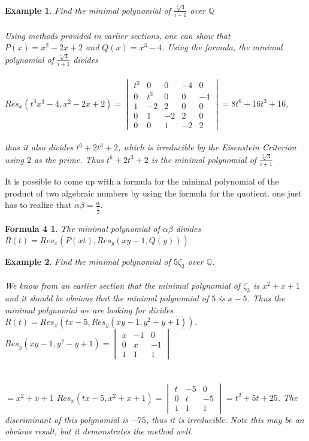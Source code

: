 \documentclass{article}
\newtheorem*{Definition: Sylvester Matrix}{Definition}
\newtheorem*{Definition: Resultant 1}{Definition 1}
\newtheorem*{Definition: Resultant 2}{Definition 2}
\newtheorem*{Theorem: Resultant proves shared roots}{Theorem 1}
\newtheorem*{Theorem: Minimal polynomial for beta}{Theorem 2}
\newtheorem*{Example: Sylvester Matrix Ex}{Example}
\newtheorem*{Theorem: Roots}{Theorem}
\newtheorem*{Corollary: Discriminant}{Corollary}
\newtheorem*{Theorem: Rational Root Theorem}{Theorem}
\newtheorem*{Corollary: Cubic Irreducibility}{Corollary}
\newtheorem*{Theorem: Eisenstein Criterion}{Theorem}
\newtheorem*{Theorem: mod p Test}{Theorem}
\newtheorem*{Theorem: Rabin's algorithm}{Theorem}
\newtheorem*{Theorem: gcd finite field}{Theorem}
\newtheorem*{Theorem: Gauss Irreducibles}{Theorem}
\newtheorem*{Theorem: Number of irreducibles}{Theorem}
\newtheorem*{Example: All irreducibles in Z_2}{Example}
\newtheorem*{Formula: Minimal polynomial for r root of a}{Formula 1}
\newtheorem*{Example: minimal polynomial for sqrt(p)}{Example}
\newtheorem*{Example: Golden Ratio}{Example}
\newtheorem*{Formula: Minimal polynomial for a+b}{Formula 2}
\newtheorem*{Example: 1 + sqrt(3)}{Example}
\newtheorem*{Example: cubic root of unity}{Example}
\newtheorem*{Formula: Minimal polynomial for a/b}{Formula 3}
\newtheorem*{Formula: Minimal polynomial for ab}{Formula 4}
\newtheorem*{Example: cubrt(4)/i+1}{Example}
\newtheorem*{Example: 5zeta}{Example}
\newtheorem*{Example: Wild one}{Example}
\begin{document}
\begin{Example: 5zeta}
Find the minimal polynomial of $\frac{\sqrt[3]{4}}{i+1}$ over $\mathbb{Q}$\\\\
Using methods provided in earlier sections, one can show that $P(x)=x^2-2x+2$ and $Q(x)=x^3-4$. Using the formula, the minimal polynomial of $\frac{\sqrt[3]{4}}{i+1}$ divides\\\\
 $Res_x(t^3x^3-4, x^2-2x+2) = \begin{vmatrix} t^3 & 0 & 0 & -4 & 0 \\ 0 & t^3 & 0 & 0 & -4 \\ 1 & -2 & 2 & 0 & 0 \\ 0 & 1 & -2 & 2 & 0 \\ 0 & 0 & 1 & -2 & 2 \end{vmatrix} = 8t^6+16t^3+16$, \\\\
 thus it also divides $t^6+2t^3+2$, which is irreducible by the Eisenstein Criterion using $2$ as the prime. Thus $t^6+2t^3+2$ is the minimal polynomial of  $\frac{\sqrt[3]{4}}{i+1}$
\end{Example: 5zeta}

It is possible to come up with a formula for the minimal polynomial of the product of two algebraic numbers by using the formula for the quotient. 
one just has to realize that $\alpha \beta = \frac{\alpha}{\frac{1}{\beta}}$.

\begin{Formula: Minimal polynomial for ab}
The minimal polynomial of $\alpha \beta$ divides $R(t)=Res_x(P(xt), Res_y(xy-1, Q(y)))$
\end{Formula: Minimal polynomial for ab}

\begin{Example: 5zeta}
Find the minimal polynomial of $5\zeta_3$ over $\mathbb{Q}$.\\\\
We know from an earlier section that the minimal polynomial of $\zeta_3$ is $x^2+x+1$ and it should be obvious that the minimal polynomial of $5$ is $x-5$. Thus the minimal polynomial we are looking for divides $R(t) = Res_x(tx-5, Res_y(xy-1, y^2+y+1))$. $Res_y(xy-1, y^2-y+1) = \begin{vmatrix} x & -1 & 0 \\ 0 & x & -1 \\ 1 & 1 & 1 \end{vmatrix}$\\\\\\
$= x^2+x+1$ $Res_x(tx-5, x^2+x+1)= \begin{vmatrix} t & -5 & 0 \\ 0 & t & -5  \\ 1 & 1 & 1  \end{vmatrix} =t^2+5t+25$. The discriminant of this polynomial is $-75$, thus it is irreducible. Note this may be an obvious result, but it demonstrates the method well.
\end{Example: 5zeta}
\end{document}
